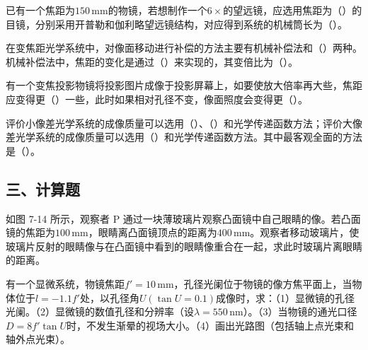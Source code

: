 \documentclass[standard, analysis, notocnum]{ExBook}
\newcommand{\answerarea}[1][8cm]{%
  \par\vspace{2mm}%
  \noindent{\color{themeColor!35}\rule{\linewidth}{0.4pt}}\par
  \noindent\begin{minipage}[t][#1][t]{\linewidth}\vspace{0pt}\end{minipage}\par
  \noindent{\color{themeColor!35}\rule{\linewidth}{0.4pt}}\par
}
\begin{document}
\begin{qitems}
\begin{bbox}
\qitem 已有一个焦距为$150\,\mathrm{mm}$的物镜，若想制作一个$6\times$的望远镜，应选用焦距为（\hspace{1.6em}）的目镜，分别采用开普勒和伽利略望远镜结构，对应得到系统的机械筒长为（\hspace{1.6em}）。
\answerarea[3.5cm]
\end{bbox}
\begin{bbox}
\qitem 在变焦距光学系统中，对像面移动进行补偿的方法主要有机械补偿法和（\hspace{1.6em}）两种。机械补偿法中，焦距的变化是通过（\hspace{1.6em}）来实现的，其变倍比为（\hspace{1.6em}）。
\answerarea[3.5cm]
\end{bbox}
\begin{bbox}
\qitem 有一个变焦投影物镜将投影图片成像于投影屏幕上，如要使放大倍率再大些，焦距应变得更（\hspace{1.6em}）一些，此时如果相对孔径不变，像面照度会变得更（\hspace{1.6em}）。
\answerarea[3.5cm]
\end{bbox}
\begin{bbox}
\qitem 评价小像差光学系统的成像质量可以选用（\hspace{1.6em}）、（\hspace{1.6em}）和光学传递函数方法；评价大像差光学系统的成像质量可以选用（\hspace{1.6em}）和光学传递函数方法。其中最客观全面的方法是（\hspace{1.6em}）。
\answerarea[3.5cm]
\end{bbox}
\end{qitems}

\subsection{三、计算题}
\begin{qitems}[startnum=1]
\qitem 如图 7-14 所示，观察者 P 通过一块薄玻璃片观察凸面镜中自己眼睛的像。若凸面镜的焦距为$100\,\mathrm{mm}$，眼睛离凸面镜顶点的距离为$400\,\mathrm{mm}$。观察者移动玻璃片，使玻璃片反射的眼睛像与在凸面镜中看到的眼睛像重合在一起，求此时玻璃片离眼睛的距离。
\label{q:140:start}
\answerarea[8cm]
\label{q:140:end}
\end{qitems}

\begin{qitems}[startnum=2]
\qitem 有一个显微系统，物镜焦距$f'=10\,\mathrm{mm}$，孔径光阑位于物镜的像方焦平面上，当物体位于$l=-1.1f'$处，以孔径角$U(\tan U=0.1)$成像时，求：（1）显微镜的孔径光阑。（2）显微镜的数值孔径和分辨率（设$\lambda =550\,\mathrm{nm}$）。（3）当物镜的通光口径$D=8f'\tan U$时，不发生渐晕的视场大小。（4）画出光路图（包括轴上点光束和轴外点光束）。
\label{q:141:start}
\answerarea[8cm]
\label{q:141:end}
\end{qitems}
\end{document}
